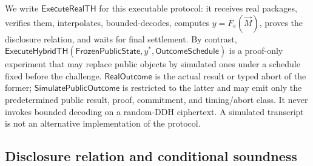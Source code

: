 \documentclass[pdflatex,sn-mathphys-num]{sn-jnl}%
\theoremstyle{thmstyleone}%
\theoremstyle{thmstyletwo}%
\theoremstyle{thmstylethree}%
\begin{document}
We write $\mathsf{ExecuteRealTH}$ for this executable protocol: it receives
real packages, verifies them, interpolates, bounded-decodes, computes
$y=F_e(\vec M)$, proves the disclosure relation, and waits for final settlement.
By contrast,
$\mathsf{ExecuteHybridTH}(\mathsf{FrozenPublicState},y^*,
\mathsf{OutcomeSchedule})$ is a proof-only experiment that may replace public
objects by simulated ones under a schedule fixed before the challenge.
$\mathsf{RealOutcome}$ is the actual result or typed abort of the former;
$\mathsf{SimulatePublicOutcome}$ is restricted to the latter and may emit only
the predetermined public result, proof, commitment, and timing/abort class.
It never invokes bounded decoding on a random-DDH ciphertext.  A simulated
transcript is not an alternative implementation of the protocol.

\subsection{Disclosure relation and conditional soundness}
\label{subsec:disclosure-relation}
\end{document}
